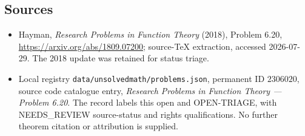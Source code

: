 \documentclass[11pt]{article}
\begin{document}
\subsection{Sources}
\begin{itemize}
\item Hayman, \emph{Research Problems in Function Theory} (2018), Problem 6.20, \url{https://arxiv.org/abs/1809.07200}; source-TeX extraction, accessed 2026-07-29. The 2018 update was retained for status triage.
\item Local registry \texttt{data/unsolvedmath/problems.json}, permanent ID $2306020$, source code catalogue entry, \emph{Research Problems in Function Theory --- Problem 6.20}. The record labels this open and OPEN-TRIAGE, with NEEDS\_REVIEW source-status and rights qualifications. No further theorem citation or attribution is supplied.
\end{itemize}
\end{document}
